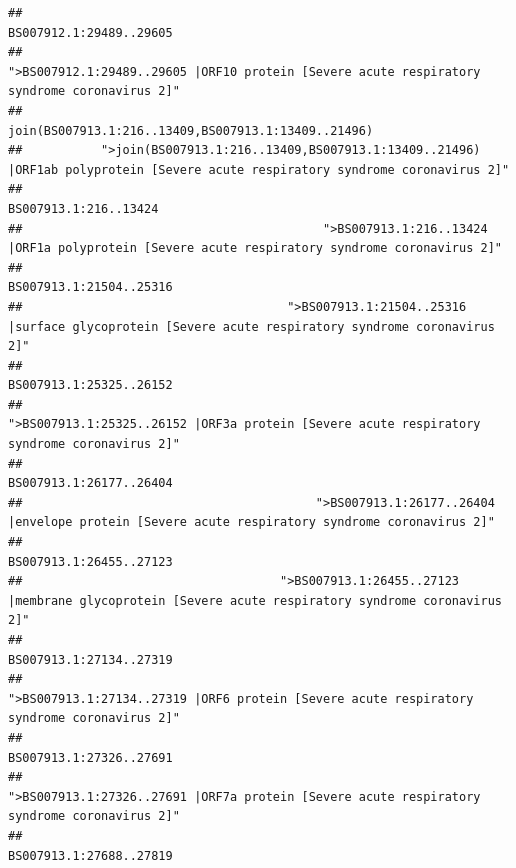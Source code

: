 \documentclass[
]{article}
\begin{document}
\begin{verbatim}
##                                                                                                                BS007912.1:29489..29605 
##                                            ">BS007912.1:29489..29605 |ORF10 protein [Severe acute respiratory syndrome coronavirus 2]" 
##                                                                                    join(BS007913.1:216..13409,BS007913.1:13409..21496) 
##           ">join(BS007913.1:216..13409,BS007913.1:13409..21496) |ORF1ab polyprotein [Severe acute respiratory syndrome coronavirus 2]" 
##                                                                                                                  BS007913.1:216..13424 
##                                          ">BS007913.1:216..13424 |ORF1a polyprotein [Severe acute respiratory syndrome coronavirus 2]" 
##                                                                                                                BS007913.1:21504..25316 
##                                     ">BS007913.1:21504..25316 |surface glycoprotein [Severe acute respiratory syndrome coronavirus 2]" 
##                                                                                                                BS007913.1:25325..26152 
##                                            ">BS007913.1:25325..26152 |ORF3a protein [Severe acute respiratory syndrome coronavirus 2]" 
##                                                                                                                BS007913.1:26177..26404 
##                                         ">BS007913.1:26177..26404 |envelope protein [Severe acute respiratory syndrome coronavirus 2]" 
##                                                                                                                BS007913.1:26455..27123 
##                                    ">BS007913.1:26455..27123 |membrane glycoprotein [Severe acute respiratory syndrome coronavirus 2]" 
##                                                                                                                BS007913.1:27134..27319 
##                                             ">BS007913.1:27134..27319 |ORF6 protein [Severe acute respiratory syndrome coronavirus 2]" 
##                                                                                                                BS007913.1:27326..27691 
##                                            ">BS007913.1:27326..27691 |ORF7a protein [Severe acute respiratory syndrome coronavirus 2]" 
##                                                                                                                BS007913.1:27688..27819 

\end{verbatim}
\end{document}
